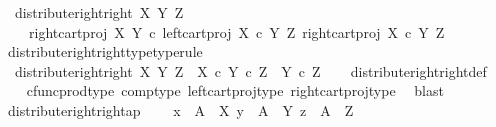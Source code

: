\begin{isabellebody}
\ \ {\isachardoublequoteopen}distribute{\isacharunderscore}{\kern0pt}right{\isacharunderscore}{\kern0pt}right\ X\ Y\ Z\ {\isacharequal}{\kern0pt}\ \isanewline
\ \ \ \ {\isasymlangle}right{\isacharunderscore}{\kern0pt}cart{\isacharunderscore}{\kern0pt}proj\ X\ Y\ {\isasymcirc}\isactrlsub c\ left{\isacharunderscore}{\kern0pt}cart{\isacharunderscore}{\kern0pt}proj\ {\isacharparenleft}{\kern0pt}X\ {\isasymtimes}\isactrlsub c\ Y{\isacharparenright}{\kern0pt}\ Z{\isacharcomma}{\kern0pt}\ right{\isacharunderscore}{\kern0pt}cart{\isacharunderscore}{\kern0pt}proj\ {\isacharparenleft}{\kern0pt}X\ {\isasymtimes}\isactrlsub c\ Y{\isacharparenright}{\kern0pt}\ Z{\isasymrangle}{\isachardoublequoteclose}\isanewline
\isanewline
{}\isamarkupfalse%
\ distribute{\isacharunderscore}{\kern0pt}right{\isacharunderscore}{\kern0pt}right{\isacharunderscore}{\kern0pt}type{\isacharbrackleft}{\kern0pt}type{\isacharunderscore}{\kern0pt}rule{\isacharbrackright}{\kern0pt}{\isacharcolon}{\kern0pt}\isanewline
\ \ {\isachardoublequoteopen}distribute{\isacharunderscore}{\kern0pt}right{\isacharunderscore}{\kern0pt}right\ X\ Y\ Z\ {\isacharcolon}{\kern0pt}\ {\isacharparenleft}{\kern0pt}X\ {\isasymtimes}\isactrlsub c\ Y{\isacharparenright}{\kern0pt}\ {\isasymtimes}\isactrlsub c\ Z\ {\isasymrightarrow}\ Y\ {\isasymtimes}\isactrlsub c\ Z{\isachardoublequoteclose}\isanewline
%
\isadelimproof
\ \ %
\endisadelimproof
%
\isatagproof
{}\isamarkupfalse%
\ distribute{\isacharunderscore}{\kern0pt}right{\isacharunderscore}{\kern0pt}right{\isacharunderscore}{\kern0pt}def\isanewline
\ \ \isamarkupfalse%
\ cfunc{\isacharunderscore}{\kern0pt}prod{\isacharunderscore}{\kern0pt}type\ comp{\isacharunderscore}{\kern0pt}type\ left{\isacharunderscore}{\kern0pt}cart{\isacharunderscore}{\kern0pt}proj{\isacharunderscore}{\kern0pt}type\ right{\isacharunderscore}{\kern0pt}cart{\isacharunderscore}{\kern0pt}proj{\isacharunderscore}{\kern0pt}type\ \isamarkupfalse%
\ blast%
\endisatagproof
{\isafoldproof}%
%
\isadelimproof
\isanewline
%
\endisadelimproof
\isanewline
{}\isamarkupfalse%
\ distribute{\isacharunderscore}{\kern0pt}right{\isacharunderscore}{\kern0pt}right{\isacharunderscore}{\kern0pt}ap{\isacharcolon}{\kern0pt}\ \isanewline
\ \ \ {\isachardoublequoteopen}x\ {\isacharcolon}{\kern0pt}\ A\ {\isasymrightarrow}\ X{\isachardoublequoteclose}\ {\isachardoublequoteopen}y\ {\isacharcolon}{\kern0pt}\ A\ {\isasymrightarrow}\ Y{\isachardoublequoteclose}\ {\isachardoublequoteopen}z\ {\isacharcolon}{\kern0pt}\ A\ {\isasymrightarrow}\ Z{\isachardoublequoteclose}\isanewline

\end{isabellebody}
